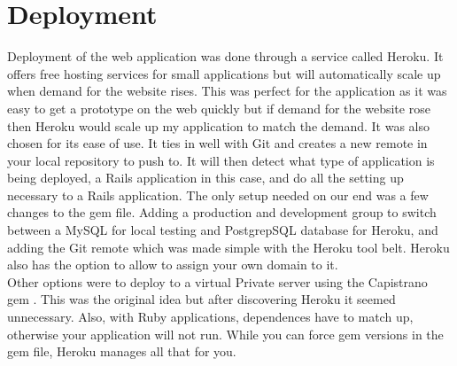 \section{Deployment}
\label{sec:deployment}
Deployment of the web application was done through a service called Heroku. It offers free hosting services for small applications but will automatically scale up when demand for the website rises. This was perfect for the application as it was easy to get a prototype on the web quickly but if demand for the website rose then Heroku would scale up my application to match the demand. It was also chosen for its ease of use. It ties in well with Git and creates a new remote in your local repository to push to. It will then detect what type of application is being deployed, a Rails application in this case, and do all the setting up necessary to a Rails application. The only setup needed on our end was a few changes to the gem file. Adding a production and development group to switch between a MySQL \citep{mysql:1995} for local testing and PostgrepSQL \citep{postgres:1995} database for Heroku, and adding the Git remote which was made simple with the Heroku tool belt. Heroku also has the option to allow to assign your own domain to it.\\

Other options were to deploy to a virtual Private server using the Capistrano gem \citep{capistrano:2013}. This was the original idea but after discovering Heroku it seemed unnecessary. Also, with Ruby applications, dependences have to match up, otherwise your application will not run. While you can force gem versions in the gem file, Heroku manages all that for you.
